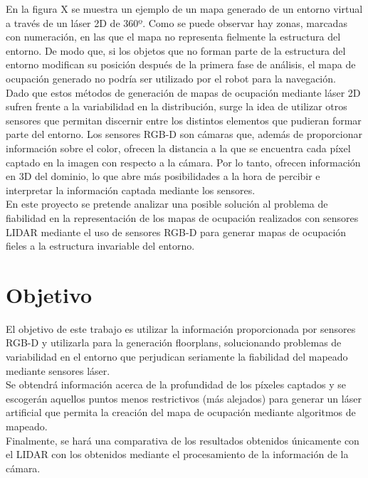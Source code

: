 
En la figura X se muestra un ejemplo de un mapa generado de un entorno virtual a través de un láser 2D de 360º. Como se puede observar hay zonas, marcadas con numeración, en las que el mapa no representa fielmente la estructura del entorno. De modo que, si los objetos que no forman parte de la estructura del entorno modifican su posición después de la primera fase de análisis, el mapa de ocupación generado no podría ser utilizado por el robot para la navegación. \\

Dado que estos métodos de generación de mapas de ocupación mediante láser 2D sufren frente a la variabilidad en la distribución, surge la idea de utilizar otros sensores que permitan discernir entre los distintos elementos que pudieran formar parte del entorno. Los sensores RGB-D son cámaras que, además de proporcionar información sobre el color, ofrecen la distancia a la que se encuentra cada píxel captado en la imagen con respecto a la cámara. Por lo tanto, ofrecen información en 3D del dominio, lo que abre más posibilidades a la hora de percibir e interpretar la información captada mediante los sensores.\\

En este proyecto se pretende analizar una posible solución al problema de fiabilidad en la representación de los mapas de ocupación realizados con sensores LIDAR mediante el uso de sensores RGB-D para generar mapas de ocupación fieles a la estructura invariable del entorno.\\

\section{Objetivo}

El objetivo de este trabajo es utilizar la información proporcionada por sensores RGB-D y utilizarla para la generación floorplans, solucionando problemas de variabilidad en el entorno que perjudican seriamente la fiabilidad  del mapeado mediante sensores láser.\\

Se obtendrá información acerca de la profundidad de los píxeles captados y se escogerán aquellos puntos menos restrictivos (más alejados) para generar un láser artificial que permita la creación del mapa de ocupación mediante algoritmos de mapeado.\\

Finalmente, se hará una comparativa de los resultados obtenidos únicamente con el LIDAR con los obtenidos mediante el procesamiento de la información de la cámara.\\